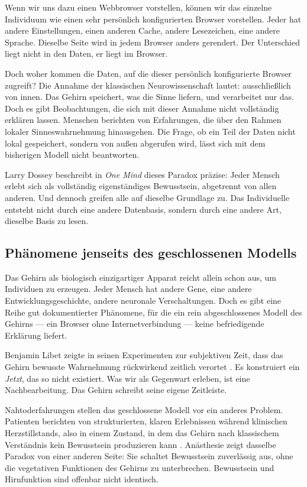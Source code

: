 \documentclass[11pt,a4paper]{article}
\begin{document}
Wenn wir uns dazu einen Webbrowser vorstellen, können wir das einzelne Individuum
wie einen sehr persönlich konfigurierten Browser vorstellen. Jeder hat andere
Einstellungen, einen anderen Cache, andere Lesezeichen, eine andere Sprache. Dieselbe
Seite wird in jedem Browser anders gerendert. Der Unterschied liegt nicht in den Daten,
er liegt im Browser.

Doch woher kommen die Daten, auf die dieser persönlich konfigurierte Browser zugreift?
Die Annahme der klassischen Neurowissenschaft lautet: ausschließlich von innen. Das
Gehirn speichert, was die Sinne liefern, und verarbeitet nur das. Doch es gibt
Beobachtungen, die sich mit dieser Annahme nicht vollständig erklären lassen. Menschen
berichten von Erfahrungen, die über den Rahmen lokaler Sinneswahrnehmung hinausgehen.
Die Frage, ob ein Teil der Daten nicht lokal gespeichert, sondern von außen abgerufen
wird, lässt sich mit dem bisherigen Modell nicht beantworten.

Larry Dossey beschreibt in \emph{One Mind} \citep{dossey2013} dieses Paradox präzise:
Jeder Mensch erlebt sich als vollständig eigenständiges Bewusstsein, abgetrennt von
allen anderen. Und dennoch greifen alle auf dieselbe Grundlage zu. Das Individuelle
entsteht nicht durch eine andere Datenbasis, sondern durch eine andere Art, dieselbe
Basis zu lesen.

\subsection*{Phänomene jenseits des geschlossenen Modells}

Das Gehirn als biologisch einzigartiger Apparat reicht allein schon aus, um
Individuen zu erzeugen. Jeder Mensch hat andere Gene, eine andere
Entwicklungsgeschichte, andere neuronale Verschaltungen. Doch es gibt eine Reihe gut
dokumentierter Phänomene, für die ein rein abgeschlossenes Modell des Gehirns — ein
Browser ohne Internetverbindung — keine befriedigende Erklärung liefert.

Benjamin Libet zeigte in seinen Experimenten zur subjektiven Zeit, dass das Gehirn
bewusste Wahrnehmung rückwirkend zeitlich verortet \citep{libet2004}. Es konstruiert
ein \emph{Jetzt}, das so nicht existiert. Was wir als Gegenwart erleben, ist eine
Nachbearbeitung. Das Gehirn schreibt seine eigene Zeitleiste.

Nahtoderfahrungen stellen das geschlossene Modell vor ein anderes Problem. Patienten
berichten von strukturierten, klaren Erlebnissen während klinischen Herzstillstands,
also in einem Zustand, in dem das Gehirn nach klassischem Verständnis kein Bewusstsein
produzieren kann \citep{parnia2014,parnia2023,sartori2008}. Anästhesie zeigt dasselbe
Paradox von einer anderen Seite: Sie schaltet Bewusstsein zuverlässig aus, ohne die
vegetativen Funktionen des Gehirns zu unterbrechen. Bewusstsein und Hirnfunktion sind
offenbar nicht identisch.
\end{document}
